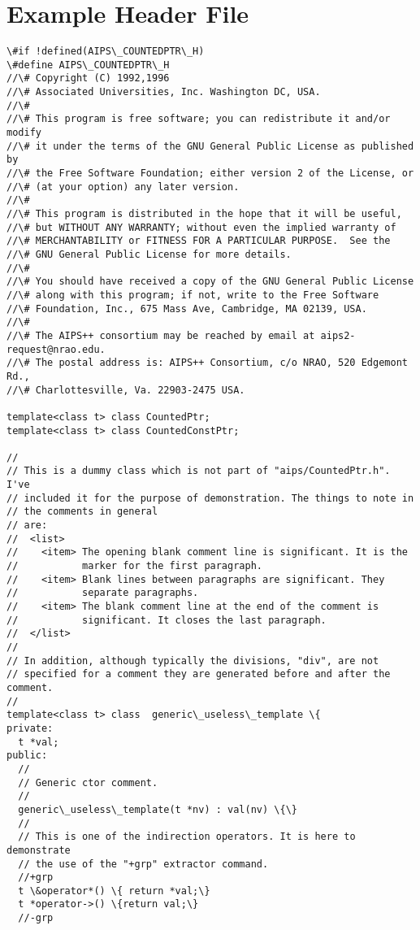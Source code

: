 \section{Example Header File}
\begin{verbatim}
\#if !defined(AIPS\_COUNTEDPTR\_H)
\#define AIPS\_COUNTEDPTR\_H
//\# Copyright (C) 1992,1996
//\# Associated Universities, Inc. Washington DC, USA.
//\# 
//\# This program is free software; you can redistribute it and/or modify
//\# it under the terms of the GNU General Public License as published by
//\# the Free Software Foundation; either version 2 of the License, or
//\# (at your option) any later version.
//\# 
//\# This program is distributed in the hope that it will be useful,
//\# but WITHOUT ANY WARRANTY; without even the implied warranty of
//\# MERCHANTABILITY or FITNESS FOR A PARTICULAR PURPOSE.  See the
//\# GNU General Public License for more details.
//\# 
//\# You should have received a copy of the GNU General Public License
//\# along with this program; if not, write to the Free Software
//\# Foundation, Inc., 675 Mass Ave, Cambridge, MA 02139, USA.
//\# 
//\# The AIPS++ consortium may be reached by email at aips2-request@nrao.edu.
//\# The postal address is: AIPS++ Consortium, c/o NRAO, 520 Edgemont Rd., 
//\# Charlottesville, Va. 22903-2475 USA.

template<class t> class CountedPtr;
template<class t> class CountedConstPtr;

//
// This is a dummy class which is not part of "aips/CountedPtr.h". I've 
// included it for the purpose of demonstration. The things to note in 
// the comments in general
// are:
//  <list>
//    <item> The opening blank comment line is significant. It is the 
//           marker for the first paragraph.
//    <item> Blank lines between paragraphs are significant. They 
//           separate paragraphs.
//    <item> The blank comment line at the end of the comment is 
//           significant. It closes the last paragraph.
//  </list>
//
// In addition, although typically the divisions, "div", are not 
// specified for a comment they are generated before and after the comment.
//
template<class t> class  generic\_useless\_template \{
private:
  t *val;
public:
  //
  // Generic ctor comment.
  //
  generic\_useless\_template(t *nv) : val(nv) \{\}
  //
  // This is one of the indirection operators. It is here to demonstrate
  // the use of the "+grp" extractor command.
  //+grp
  t \&operator*() \{ return *val;\}
  t *operator->() \{return val;\}
  //-grp


\end{verbatim}
